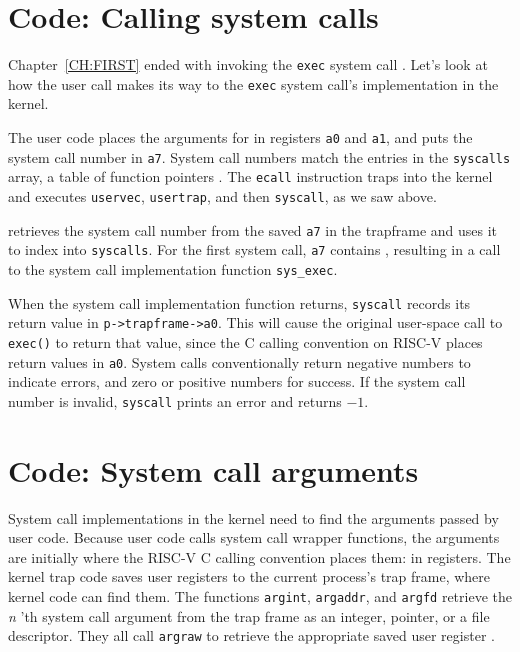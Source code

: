 \section{Code: Calling system calls}

Chapter~\ref{CH:FIRST} ended with 
invoking the {\tt exec} system call
.
Let's look at how the user call
makes its way to the {\tt exec} system call's
implementation in the kernel.

The user code places the arguments for
in registers {\tt a0} and {\tt a1}, and puts the
system call number in
\texttt{a7}.
System call numbers match the entries in the {\tt syscalls} array,
a table of function pointers
.
The \lstinline{ecall} instruction traps into the kernel
and executes {\tt uservec},
{\tt usertrap}, and then {\tt syscall}, as we saw above.

retrieves the system call number from the saved
\texttt{a7} in the trapframe
and uses it to index into {\tt syscalls}.
For the first system call, 
\texttt{a7}
contains 
,
resulting in a call to the system call implementation function
\lstinline{sys_exec}.

When the system call implementation function returns,
\lstinline{syscall}
records its return value in
\lstinline{p->trapframe->a0}.
This will cause the original user-space call to 
{\tt exec()} to return that value, since the C
calling convention on RISC-V places return values in {\tt a0}.
System calls conventionally return negative numbers to indicate
errors, and zero or positive numbers for success.
If the system call number is invalid,
\lstinline{syscall}
prints an error and returns $-1$.

\section{Code: System call arguments}

System call implementations in the kernel need to find the arguments
passed by user code. Because user code calls system call wrapper
functions, the arguments are initially where the RISC-V C calling
convention places them: in registers.
The kernel trap code saves user registers to the current
process's trap frame, where kernel code can find them.
The functions
\lstinline{argint},
\lstinline{argaddr},
and
\lstinline{argfd}
retrieve the 
\textit{n} 'th 
system call argument
from the trap frame
as an integer, pointer, or a file descriptor.
They all call {\tt argraw} to retrieve the appropriate saved
user register
.

